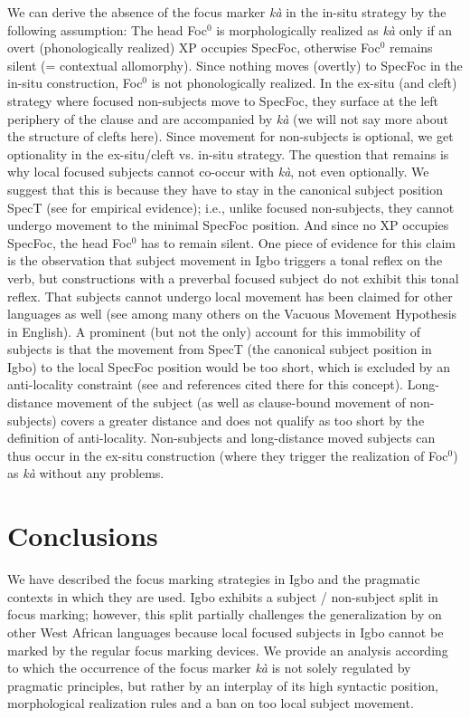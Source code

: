 \documentclass[output=paper,colorlinks,citecolor=brown]{langscibook}
\begin{document}
We can derive the absence of the focus marker \textit{k\`a} in the in-situ strategy by the following assumption: The head Foc$^{0}$ is morphologically realized as \textit{k\`a} only if an overt (phonologically realized) XP occupies SpecFoc, otherwise Foc$^{0}$ remains silent (= contextual allomorphy). Since nothing moves (overtly) to SpecFoc in the in-situ construction, Foc$^{0}$ is not phonologically realized. In the ex-situ (and cleft) strategy where focused non-subjects move to SpecFoc, they surface at the left periphery of the clause and are accompanied by \textit{k\`a} (we will not say more about the structure of clefts here). Since movement for non-subjects is optional, we get optionality in the ex-situ/cleft vs. in-situ strategy. The question that remains is why local focused subjects cannot co-occur with  \textit{k\`a}, not even optionally. We suggest that this is because they have to stay in the canonical subject position SpecT (see \citealt{AmaechiGeorgi2019} for empirical evidence); i.e., unlike focused non-subjects, they cannot undergo movement to the minimal SpecFoc position. And since no XP occupies SpecFoc, the head Foc$^{0}$ has to remain silent. One piece of evidence for this claim is the observation that subject movement in Igbo triggers a tonal reflex on the verb, but constructions with a preverbal focused subject do not exhibit this tonal reflex. That subjects cannot undergo local movement has been claimed for other languages as well (see among many others \citealt{Chomsky1986, Agbayani1997} on the Vacuous Movement Hypothesis in English). A prominent (but not the only) account for this immobility of subjects is that the movement from SpecT (the canonical subject position in Igbo) to the local SpecFoc position would be too short, which is excluded by an anti-locality constraint (see \citealt{Abels2003, Grohmann2003, Erlewine2016} and references cited there for this concept). Long-distance movement of the subject (as well as clause-bound movement of non-subjects) covers a greater distance and does not qualify as too short by the definition of anti-locality. Non-subjects and long-distance moved subjects can thus occur in the ex-situ construction (where they trigger the realization of Foc$^{0}$) as \textit{k\`a} without any problems.

\section{Conclusions}\label{sec:amaechi:6}

We have described the focus marking strategies in Igbo and the pragmatic contexts in which they are used. Igbo exhibits a subject / non-subject split in focus marking; however, this split partially challenges the generalization by \citet{FiedlerEtAl2010} on other West African languages because local focused subjects in Igbo cannot be marked by the regular focus marking devices. We provide an analysis according to which the occurrence of the focus marker \textit{k\`a} is not solely regulated by pragmatic principles, but rather by an interplay of its high syntactic position, morphological realization rules and a ban on too local subject movement.
\end{document}
